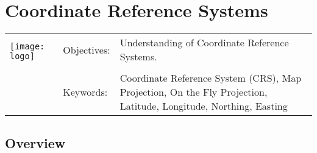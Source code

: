

\section{Coordinate Reference Systems}\label{sec:crs}
\begin{tabular}{p{3.5cm}p{6cm}p{6cm}}
\multirow{2}{*}{\texttt{[image: logo]}} & Objectives: &
Understanding of Coordinate Reference Systems. \\
& & \\
& Keywords: & 
Coordinate Reference System (CRS), Map Projection, On the Fly Projection,
Latitude, Longitude, Northing, Easting  \\
\hline
\end{tabular}

\subsection{Overview}\label{subsec:overview}


